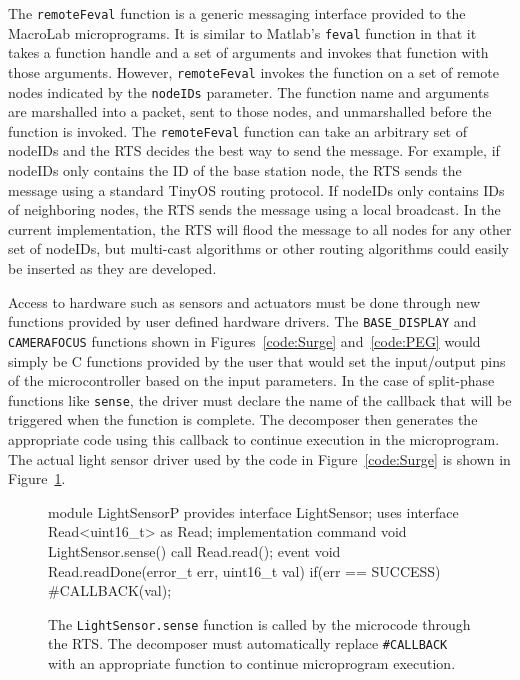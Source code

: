 The {\tt remoteFeval} function is a generic messaging interface
provided to the MacroLab microprograms.  It is similar to Matlab's
{\tt feval} function in that it takes a function handle and a set of
arguments and invokes that function with those arguments.  However,
{\tt remoteFeval} invokes the function on a set of remote nodes
indicated by the {\tt nodeIDs} parameter.  The function name and
arguments are marshalled into a packet, sent to those nodes, and
unmarshalled before the function is invoked.  The {\tt remoteFeval}
function can take an arbitrary set of nodeIDs and the RTS decides the
best way to send the message.  For example, if nodeIDs only contains
the ID of the base station node, the RTS sends the message using a
standard TinyOS routing protocol.  If nodeIDs only contains IDs of
neighboring nodes, the RTS sends the message using a local broadcast.
In the current implementation, the RTS will flood the message to all
nodes for any other set of nodeIDs, but multi-cast algorithms or other
routing algorithms could easily be inserted as they are developed.  

Access to hardware such as sensors and actuators must be done through new
functions provided by user defined hardware drivers.  The {\tt BASE\_DISPLAY}
and {\tt CAMERAFOCUS} functions shown in Figures~\ref{code:Surge}
and~\ref{code:PEG} would simply be C functions provided by the user that would
set the input/output pins of the microcontroller based on the input parameters.
In the case of split-phase functions like {\tt sense}, the driver must declare
the name of the callback that will be triggered when the function is complete.
The decomposer then generates the appropriate code using this callback to
continue execution in the microprogram.  The actual light sensor driver used by
the code in Figure~\ref{code:Surge} is shown in Figure~\ref{code:hardwareDriver}.

\begin{figure}[h]
  \begin{nesc}
module LightSensorP {
  provides interface LightSensor;
  uses interface Read<uint16_t> as Read;
}
implementation
{
  command void LightSensor.sense() {
    call Read.read();
  }
  event void Read.readDone(error_t err,
   uint16_t val) {
    if(err == SUCCESS) {
      #CALLBACK(val);
    }
  }
}
  \end{nesc}
  \caption[A split-phase hardware driver for reading from the light sensor]{The
  {\tt LightSensor.sense} function is called by the microcode through the RTS.
  The decomposer must automatically replace {\tt\#CALLBACK} with an appropriate
  function to continue microprogram execution.}
  \label{code:hardwareDriver}
\end{figure}

